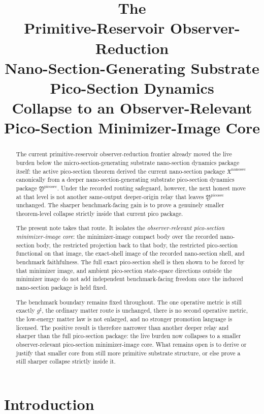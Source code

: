 \documentclass[11pt]{article}
\title{\textbf{The \TheoryName{}}\\[0.4em]
\large Primitive-Reservoir Observer-Reduction\\
\large Nano-Section-Generating Substrate Pico-Section Dynamics\\
\large Collapse to an Observer-Relevant Pico-Section Minimizer-Image Core}
\author{}
\date{}
\newcommand{\CompletedMetric}{g^{\sharp}}
\newcommand{\NanoSectionPackage}{\mathfrak X^{\mathrm{nanosec}}}
\newcommand{\PicoSectionPackage}{\mathfrak Y^{\mathrm{picosec}}}
\begin{document}
\maketitle

\begin{abstract}
The current primitive-reservoir observer-reduction frontier already moved the live burden below the micro-section-generating substrate nano-section dynamics package itself: the active pico-section theorem derived the current nano-section package \(\NanoSectionPackage\) canonically from a deeper nano-section-generating substrate pico-section dynamics package \(\PicoSectionPackage\). Under the recorded routing safeguard, however, the next honest move at that level is not another same-output deeper-origin relay that leaves \(\PicoSectionPackage\) unchanged. The sharper benchmark-facing gain is to prove a genuinely smaller theorem-level collapse strictly inside that current pico package.

The present note takes that route. It isolates the \emph{observer-relevant pico-section minimizer-image core}: the minimizer-image compact body over the recorded nano-section body, the restricted projection back to that body, the restricted pico-section functional on that image, the exact-shell image of the recorded nano-section shell, and benchmark faithfulness. The full exact pico-section shell is then shown to be forced by that minimizer image, and ambient pico-section state-space directions outside the minimizer image do not add independent benchmark-facing freedom once the induced nano-section package is held fixed.

The benchmark boundary remains fixed throughout. The one operative metric is still exactly \(\CompletedMetric\), the ordinary matter route is unchanged, there is no second operative metric, the low-energy matter law is not enlarged, and no stronger promotion language is licensed. The positive result is therefore narrower than another deeper relay and sharper than the full pico-section package: the live burden now collapses to a smaller observer-relevant pico-section minimizer-image core. What remains open is to derive or justify that smaller core from still more primitive substrate structure, or else prove a still sharper collapse strictly inside it.
\end{abstract}

\section{Introduction}
\end{document}
